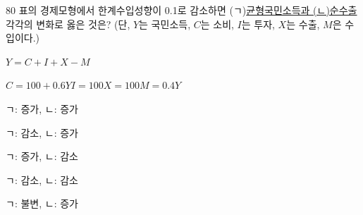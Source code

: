 \begin{question}{80}
표의 경제모형에서 한계수입성향이 0.1로 감소하면 (ㄱ)\uline{균형국민소득과 (ㄴ)순수출} 각각의 변화로 옳은 것은? (단, $Y$는 국민소득, $C$는 소비, $I$는 투자, $X$는 수출, $M$은 수입이다.)
\begin{framedtext}
$Y=C+I+X-M$ \par
$C=100+0.6Y$\quad $I=100$\quad $X=100$\quad $M=0.4Y$ \par
\end{framedtext}
\begin{choices}
  \item ㄱ: 증가, ㄴ: 증가
  \item ㄱ: 감소, ㄴ: 증가
  \item ㄱ: 증가, ㄴ: 감소
  \item ㄱ: 감소, ㄴ: 감소
  \item ㄱ: 불변, ㄴ: 증가
\end{choices}
\end{question}

